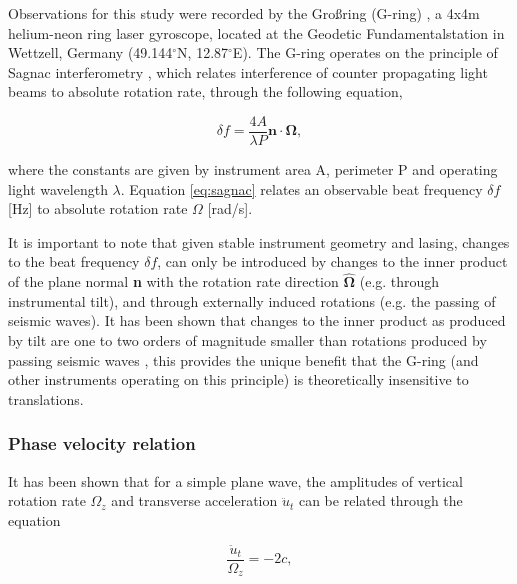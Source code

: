 \documentclass{gji}
\begin{document}
Observations for this study were recorded by the Gro\ss ring (G-ring) \cite{schreiber2006ring} , a 4x4m helium-neon ring laser gyroscope, located at the Geodetic Fundamentalstation in Wettzell, Germany (49.144$^\circ$N, 12.87$^\circ$E). The G-ring operates on the principle of Sagnac interferometry \cite{stedman1997ring}, which relates interference of counter propagating light beams to absolute rotation rate, through the following equation, 

\begin{equation}\label{eq:sagnac}
	\delta f = \frac{4A}{\lambda P}\mathbf{n}\cdot \mathbf{\Omega},
\end{equation}

\noindent where the constants are given by instrument area A, perimeter P and operating light wavelength $\lambda$. Equation \ref{eq:sagnac} relates an observable beat frequency $\delta f$ [Hz] to absolute rotation rate $\Omega$ [rad/s].

It is important to note that given stable instrument geometry and lasing, changes to the beat frequency $\delta f$, can only be introduced by changes to the inner product of the plane normal {\bfseries n} with the rotation rate direction $\mathbf{\hat{\Omega}}$ (e.g. through instrumental tilt), and through externally induced rotations (e.g. the passing of seismic waves). It has been shown that changes to the inner product as produced by tilt are one to two orders of magnitude smaller than rotations produced by passing seismic waves \cite{mcleod1998comparison} \cite{schreiber2006ring} , this provides the unique benefit that the G-ring (and other instruments operating on this principle) is theoretically insensitive to translations.

\subsubsection{Phase velocity relation}\label{phasevel}
It has been shown that for a simple plane wave, the amplitudes of vertical rotation rate $\Omega_z$  and transverse acceleration $\ddot{u}_t$ can be related through the equation 

\begin{equation}\label{phasevelocity}
	\frac{\ddot{u}_t}{\Omega_z} = -2c,
\end{equation}
\end{document}
